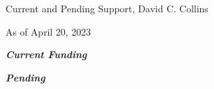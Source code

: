 \documentclass[10pt]{article}
\begin{document}
\newcommand{\LT}[1]{\noindent\textbf{#1}}
\begin{LARGE}
\noindent Current and Pending Support, David C. Collins
\end{LARGE}

As of April 20, 2023



\vspace{0.1in}

\noindent \large{\textbf{\emph{Current Funding}}}

\vspace{0.1in}



\vspace{0.1in}

\noindent \large{\textbf{\emph{Pending}}}

\vspace{0.1in}



\vspace{0.1in}



\vspace{0.1in}
\end{document}
